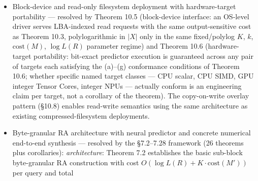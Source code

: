 \documentclass[
]{article}
\begin{document}
\begin{itemize}
  non-uniform binary-search entry (full statement in Theorem 10.4). The cost is polylogarithmic in
  archive size $|X|$ only in the parameter regime where the
  sync-point spacing $K$, read window $k$, predictor-evaluation cost
  $\mathrm{cost}(M)$, and $\log L(R)$ are held fixed or grow at most
  polylogarithmically in $|X|$; outside that
  regime (e.g., $K = \Theta(|X|)$ or $k = \Theta(|X|)$) the cost is
  $\Theta(|X| \cdot \mathrm{cost}(M))$. This is the framework's
  deployment-grade distinguishing feature relative to other neural
  compressors: autoregressive byte/pixel models (NNCP, PixelCNN++,
  PixelSNAIL) as currently designed do not insert sync points or
  maintain a seek index and so do not support random access in
  their published form. Adding sync points to their encoders would
  give them Theorem 10.3's random access \emph{provided} the
  underlying predictor is $W$-bounded; for autoregressive
  transformers with fixed context window this holds, but for
  autoregressive RNNs/state-space models (which are not
  $W$-bounded) Theorem 10.4's state snapshots are also required
  per sync point. Block-codec schemes (Bit-Swap, IDF++, HiLLoC)
  provide only block-granular access (not byte-granular) due to
  their block-coupled latent/ANS state.
\item
  Block-device and read-only filesystem deployment with
  hardware-target portability --- resolved by Theorem 10.5
  (block-device interface: an OS-level driver serves LBA-indexed
  read requests with the same output-sensitive cost as Theorem 10.3,
  polylogarithmic in $|X|$ only in the same fixed/polylog $K$, $k$,
  $\mathrm{cost}(M)$, $\log L(R)$ parameter regime) and Theorem 10.6 (hardware-target
  portability: bit-exact predictor execution is guaranteed across
  any pair of targets each satisfying the (a)--(g) conformance
  conditions of Theorem 10.6; whether specific named target classes
  --- CPU scalar, CPU SIMD, GPU integer Tensor Cores, integer NPUs
  --- actually conform is an engineering claim per target, not a
  corollary of the theorem). The copy-on-write
  overlay pattern (§10.8) enables read-write semantics using the
  same architecture as existing compressed-filesystem deployments.
\item
  Byte-granular RA architecture with neural predictor and concrete
  numerical end-to-end synthesis --- resolved by the §7.2--7.28
  framework (26 theorems plus corollaries):
  \emph{architecture}: Theorem 7.2 establishes the basic sub-block
  byte-granular RA construction with cost
  $O(\log L(R) + K \cdot \mathrm{cost}(M'))$ per query and total

\end{itemize}
\end{document}
